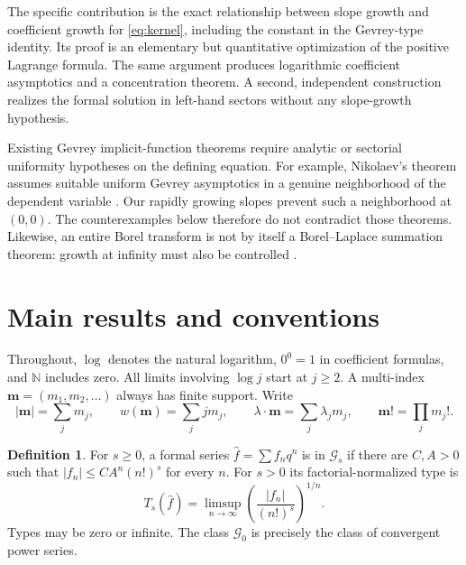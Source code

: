 \documentclass[11pt,a4paper]{article}
\numberwithin{equation}{section}
\theoremstyle{definition}
\newtheorem{definition}[theorem]{Definition}
\theoremstyle{remark}
\newcommand{\N}{\mathbb N}
\newcommand{\Gev}{\mathcal G}
\newcommand{\mm}{\boldsymbol m}
\begin{document}
The specific contribution is the exact relationship between slope growth
and coefficient growth for \eqref{eq:kernel}, including the constant in the
Gevrey-type identity.  Its proof is an elementary but quantitative
optimization of the positive Lagrange formula.  The same argument produces
logarithmic coefficient asymptotics and a concentration theorem.  A second,
independent construction realizes the formal solution in left-hand sectors
without any slope-growth hypothesis.

Existing Gevrey implicit-function theorems require analytic or sectorial
uniformity hypotheses on the defining equation.  For example, Nikolaev's
theorem assumes suitable uniform Gevrey asymptotics in a genuine
neighborhood of the dependent variable \cite{nikolaev}.  Our rapidly growing
slopes prevent such a neighborhood at $(0,0)$.  The counterexamples below
therefore do not contradict those theorems.  Likewise, an entire Borel
transform is not by itself a Borel--Laplace summation theorem: growth at
infinity must also be controlled \cite{sauzin}.

\section{Main results and conventions}
\label{sec:main}

Throughout, $\log$ denotes the natural logarithm, $0^0=1$ in coefficient
formulas, and $\N$ includes zero.  All limits involving $\log j$ start at
$j\ge2$.  A multi-index $\mm=(m_1,m_2,\ldots)$ always has finite support.
Write
\[
 |\mm|=\sum_jm_j,\qquad w(\mm)=\sum_jjm_j,\qquad
 \lambda\cdot\mm=\sum_j\lambda_jm_j,\qquad
 \mm!=\prod_jm_j!.
\]

\begin{definition}
For $s\ge0$, a formal series $\widehat f=\sum f_nq^n$ is in $\Gev_s$ if
there are $C,A>0$ such that $|f_n|\le CA^n(n!)^s$ for every $n$.
For $s>0$ its factorial-normalized type is
\[
 T_s(\widehat f)=\limsup_{n\to\infty}
       \left(\frac{|f_n|}{(n!)^s}\right)^{1/n}.
\]
Types may be zero or infinite.  The class $\Gev_0$ is precisely the class
of convergent power series.
\end{definition}
\end{document}
